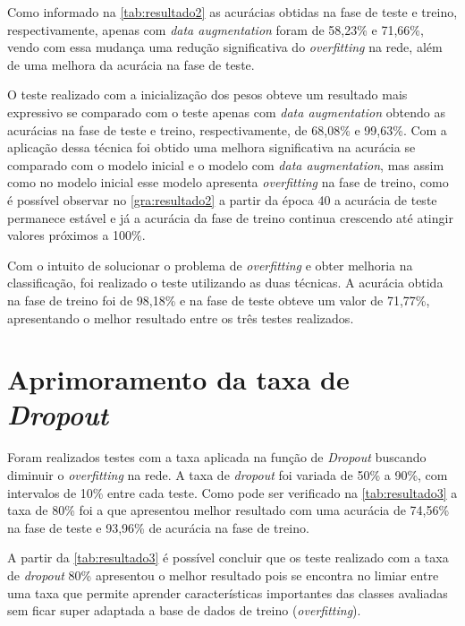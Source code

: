 \par Como informado na \autoref{tab:resultado2} as acurácias obtidas na fase de teste e treino, respectivamente, apenas com \textit{data augmentation} foram de 58,23\% e 71,66\%, vendo com essa mudança uma redução significativa do \textit{overfitting} na rede, além de uma melhora da acurácia na fase de teste.
\par O teste realizado com a inicialização dos pesos obteve um resultado mais expressivo se comparado com o teste apenas com \textit{data augmentation} obtendo as acurácias na fase de teste e treino, respectivamente, de 68,08\% e 99,63\%. Com a aplicação dessa técnica foi obtido uma melhora significativa na acurácia se comparado com o modelo inicial e o modelo com \textit{data augmentation}, mas assim como no modelo inicial esse modelo apresenta \textit{overfitting} na fase de treino, como é possível observar no \autoref{gra:resultado2} a partir da época 40 a acurácia de teste permanece estável e já a acurácia da fase de treino continua crescendo até atingir valores próximos a 100\%.

\par Com o intuito de solucionar o problema de \textit{overfitting} e obter melhoria na classificação, foi realizado o teste utilizando as duas técnicas. A acurácia obtida na fase de treino foi de 98,18\% e na fase de teste obteve um valor de 71,77\%, apresentando o melhor resultado entre os três testes realizados.%

 
\section{Aprimoramento da taxa de \textit{Dropout}}
Foram realizados testes com a taxa aplicada na função de \textit{Dropout} buscando diminuir o \textit{overfitting} na rede. A taxa de \textit{dropout} foi variada de 50\% a 90\%, com intervalos de 10\% entre cada teste. Como pode ser verificado na \autoref{tab:resultado3} a taxa de 80\% foi a que apresentou melhor resultado com uma acurácia de 74,56\% na fase de teste e 93,96\% de acurácia na fase de treino.
\par A partir da \autoref{tab:resultado3} é possível concluir que os teste realizado com a taxa de \textit{dropout} 80\% apresentou o melhor resultado pois se encontra no limiar entre uma taxa que permite aprender características importantes das classes avaliadas sem ficar super adaptada a base de dados de treino (\textit{overfitting}). 

